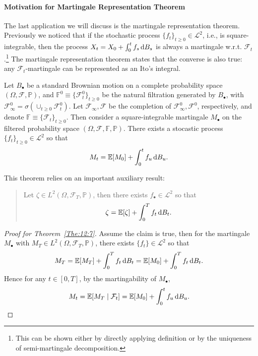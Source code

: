 \paragraph{Motivation for Martingale Representation Theorem}
The last application we will discuss is the martingale representation theorem. 
Previously we noticed that if the stochastic process $\{f_t\}_{t\ge0}\in\mathcal{L}^2$, i.e., is square-integrable, then the process $X_t=X_0+\int_0^tf_s\,\mathrm{d} B_s$ is always a martingale w.r.t. $\mathcal{F}_t$.\footnote{This can be shown either by directly applying definition or by the uniqueness of semi-martingale decomposition.}
The martingale representation theorem states that the converse is also true: any $\mathcal{F}_t$-martingale can be represented as an Ito's integral.
\begin{theorem}\label{The:12:7}
Let $B_{\bullet}$ be a standard Brownian motion on a complete probability space $(\Omega, \mathcal{F},\mathbb{P})$, and $\mathbb{F}^0\equiv\{\mathcal{F}_t^0\}_{t\ge0}$ be the natural filtration generated by $B_{\bullet}$, with $\mathcal{F}_\infty^0=\sigma\left(
\cup_{t\ge0}\mathcal{F}_t^0
\right)$. Let $\mathcal{F}_\infty,\mathcal{F}$ be the completion of $\mathcal{F}_\infty^0,\mathcal{F}^0$, respectively, and denote $\mathbb{F}\equiv \{\mathcal{F}_t\}_{t\ge0}$.
Then consider a square-integrable martingale $M_{\bullet}$ on the filtered probability space $(\Omega, \mathcal{F},\mathbb{F},\mathbb{P})$.
There exists a stocastic process $\{f_t\}_{t\ge0}\in\mathcal{L}^2$ so that
\[
M_t = \mathbb{E}[M_0] + \int_0^tf_u\,\mathrm{d} B_u.
\]
\end{theorem}
This theorem relies on an important auxiliary result:
\begin{quotation}
Let $\zeta\in L^2(\Omega,\mathcal{F}_T,\mathbb{P})$, then there exists $f_{\bullet}\in\mathcal{L}^2$ so that 
\[
\zeta = \mathbb{E}[\zeta] + \int_0^Tf_t\,\mathrm{d} B_t.
\]
\end{quotation}
\begin{proof}[Proof for Theorem~\ref{The:12:7}]
Assume the claim is true, then for the martingale $M_{\bullet}$ with $M_T\in L^2(\Omega,\mathcal{F}_T,\mathbb{P})$, there exists $\{f_t\}\in\mathcal{L}^2$ so that 
\[
M_T = \mathbb{E}[M_T]  + \int_0^Tf_t\,\mathrm{d} B_t = \mathbb{E}[M_0] + \int_0^Tf_t\,\mathrm{d} B_t.
\]
Hence for any $t\in[0,T]$, by the martingability of $M_{\bullet}$, 
\[
M_t=\mathbb{E}[M_T\mid\mathcal{F}_t]=\mathbb{E}[M_0] + \int_0^tf_u\,\mathrm{d} B_u.
\]
\end{proof}

